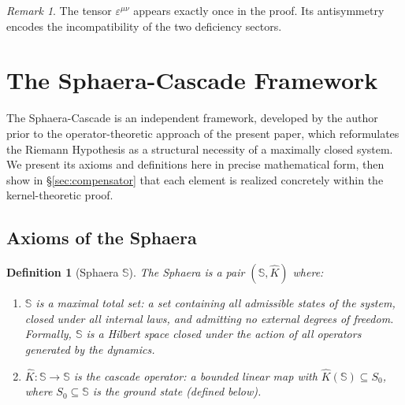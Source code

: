 \documentclass[12pt,a4paper]{article}
\newtheorem{definition}[theorem]{Definition}
\theoremstyle{remark}
\newtheorem*{remark}{Remark}
\begin{document}
\begin{remark}
The tensor $\varepsilon^{\mu\nu}$ appears exactly once in the proof.
Its antisymmetry encodes the incompatibility of the two deficiency
sectors.
\end{remark}


\section{The Sphaera-Cascade Framework}
\label{sec:sphaera}

The Sphaera-Cascade is an independent framework, developed by the author
prior to the operator-theoretic approach of the present paper,
which reformulates the Riemann Hypothesis as a structural necessity
of a maximally closed system.
We present its axioms and definitions here in precise mathematical form,
then show in \S\ref{sec:compensator} that each element is realized
concretely within the kernel-theoretic proof.

\subsection*{Axioms of the Sphaera}

\begin{definition}[Sphaera $\mathbb{S}$]\label{def:sphaera}
The \emph{Sphaera} is a pair $(\mathbb{S}, \hat{K})$ where:
\begin{enumerate}[label=(\roman*),leftmargin=*]
\item $\mathbb{S}$ is a \emph{maximal total set}: a set containing all
      admissible states of the system, closed under all internal laws,
      and admitting no external degrees of freedom.
      Formally, $\mathbb{S}$ is a Hilbert space closed under the
      action of all operators generated by the dynamics.
\item $\hat{K}:\mathbb{S}\to\mathbb{S}$ is the \emph{cascade operator}:
      a bounded linear map with $\hat{K}(\mathbb{S})\subseteq S_0$,
      where $S_0\subseteq\mathbb{S}$ is the \emph{ground state} (defined below).
\end{enumerate}
\end{definition}
\end{document}
